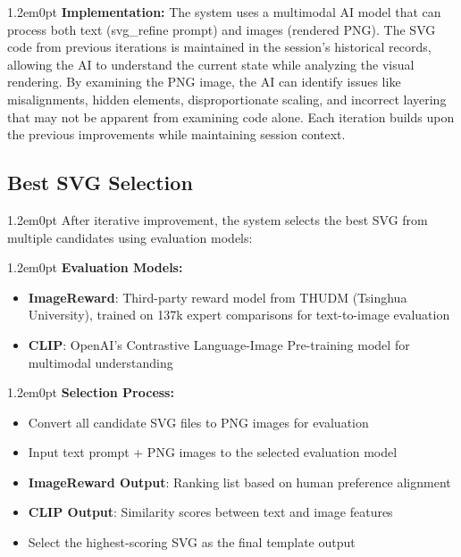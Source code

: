 \documentclass[10pt,a4paper]{article}
\newenvironment{bodytext}{\begin{adjustwidth}{1.2em}{0pt}}{\end{adjustwidth}}
\begin{document}
\begin{bodytext}
\textbf{Implementation:} The system uses a multimodal AI model that can process both text (svg\_refine prompt) and images (rendered PNG). The SVG code from previous iterations is maintained in the session's historical records, allowing the AI to understand the current state while analyzing the visual rendering. By examining the PNG image, the AI can identify issues like misalignments, hidden elements, disproportionate scaling, and incorrect layering that may not be apparent from examining code alone. Each iteration builds upon the previous improvements while maintaining session context.
\end{bodytext}

\subsection{Best SVG Selection}

\begin{bodytext}
After iterative improvement, the system selects the best SVG from multiple candidates using evaluation models:
\end{bodytext}

\begin{bodytext}
\textbf{Evaluation Models:}
\begin{itemize}
\item \textbf{ImageReward}: Third-party reward model from THUDM (Tsinghua University), trained on 137k expert comparisons for text-to-image evaluation
\item \textbf{CLIP}: OpenAI's Contrastive Language-Image Pre-training model for multimodal understanding
\end{itemize}
\end{bodytext}

\begin{bodytext}
\textbf{Selection Process:}
\begin{itemize}
\item Convert all candidate SVG files to PNG images for evaluation
\item Input text prompt + PNG images to the selected evaluation model
\item \textbf{ImageReward Output}: Ranking list based on human preference alignment
\item \textbf{CLIP Output}: Similarity scores between text and image features
\item Select the highest-scoring SVG as the final template output
\end{itemize}
\end{bodytext}
\end{document}
